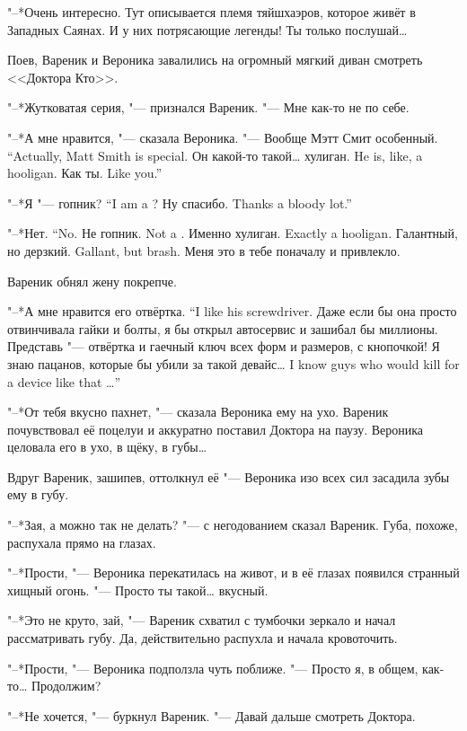 "--*Очень интересно.
Тут описывается племя тяйшхаэров, которое живёт в Западных Саянах.
И у них потрясающие легенды!
Ты только послушай\ldots{}

Поев, Вареник и Вероника завалились на огромный мягкий диван смотреть <<Доктора Кто>>.

"--*Жутковатая серия, "--- признался Вареник.
"--- Мне как-то не по себе.

"--*А мне нравится, "--- сказала Вероника.
{"--- Вообще Мэтт Смит особенный.}
{``Actually, Matt Smith is special.}
{Он какой-то такой\ldots{} хулиган.}
{He is, like, a hooligan.}
{Как ты.}
{Like you.''}

{"--*Я "--- гопник?}
{``I am a \gopnik?}
{Ну спасибо.}
{Thanks a bloody lot.''}

{"--*Нет.}
{``No.}
{Не гопник.}
{Not a \gopnik.}
{Именно хулиган.}
{Exactly a hooligan.}
{Галантный, но дерзкий.}
{Gallant, but brash.}
Меня это в тебе поначалу и привлекло.

Вареник обнял жену покрепче.

{"--*А мне нравится его отвёртка.}
{``I like his screwdriver.}
Даже если бы она просто отвинчивала гайки и болты, я бы открыл автосервис и зашибал бы миллионы.
Представь "--- отвёртка и гаечный ключ всех форм и размеров, с кнопочкой!
{Я знаю пацанов, которые бы убили за такой девайс\ldots{}}
{I know guys who would kill for a device like that \ldots{}''}

"--*От тебя вкусно пахнет, "--- сказала Вероника ему на ухо.
Вареник почувствовал её поцелуи и аккуратно поставил Доктора на паузу.
Вероника целовала его в ухо, в щёку, в губы\ldots{}

Вдруг Вареник, зашипев, оттолкнул её "--- Вероника изо всех сил засадила зубы ему в губу.

"--*Зая, а можно так не делать? "--- с негодованием сказал Вареник.
Губа, похоже, распухала прямо на глазах.

"--*Прости, "--- Вероника перекатилась на живот, и в её глазах появился странный хищный огонь.
"--- Просто ты такой\ldots{} вкусный.

"--*Это не круто, зай, "--- Вареник схватил с тумбочки зеркало и начал рассматривать губу.
Да, действительно распухла и начала кровоточить.

"--*Прости, "--- Вероника подползла чуть поближе.
"--- Просто я, в общем, как-то\ldots{}
Продолжим?

"--*Не хочется, "--- буркнул Вареник.
"--- Давай дальше смотреть Доктора.

